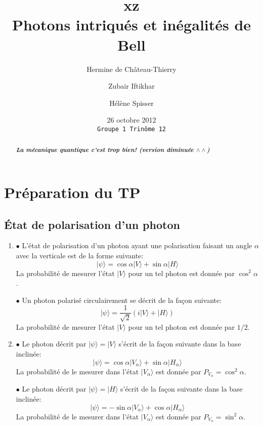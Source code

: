 \documentclass[twocolumn, 10pt]{article}
\title{ xz \\ Photons intriqués et inégalités de Bell}
\author{Hermine de Château-Thierry \and{Zubair Iftikhar} \and{Hélène Spisser}}
\date{26 octobre 2012 \\ \vspace{1em} \texttt{Groupe \no{}1 \hspace{2em} Trinôme \no{}12}}
\newcommand{\ket}[1]{\ensuremath{|#1\rangle}\xspace}
\begin{document}
\maketitle
\begin{abstract}
{{\itshape \bfseries
    La mécanique quantique c'est trop bien!
    (version diminuée $\wedge \wedge$)
}}
\end{abstract}



\section{Préparation du TP}

\subsection{\'Etat de polarisation d'un photon}

\begin{enumerate} 

    \item \par $\bullet$ L'état de polarisation d'un photon ayant une polarisation faisant un angle $\alpha$ avec la verticale est de la forme suivante:
        \[\ket{\psi} = \cos{\alpha} \ket{V} +  \sin{\alpha} \ket{H}\] 
La probabilité de mesurer l'état $\ket{V}$ pour un tel photon est donnée par $\cos^2{\alpha}$.

    \par $\bullet$ Un photon polarisé circulairement se décrit de la façon suivante:
\[\ket{\psi} =  \frac{1}{\sqrt{2}} ( i \ket{V} +  \ket{H} )\]
La probabilité de mesurer l'état $\ket{V}$ pour un tel photon est donnée par $1/2$.

    \item \par $\bullet$ Le photon décrit par $\ket{\psi} = \ket{V}$ s'écrit de la façon suivante dans la base inclinée: 
\[\ket{\psi} = \cos{\alpha} \ket{V_{\alpha}} +  \sin{\alpha} \ket{H_{\alpha}}\]
La probabilité de le mesurer dans l'état $\ket{V_{\alpha}}$ est donnée par $P_{V_{\alpha}} = \cos^2{\alpha}$.
    \par $\bullet$ Le photon décrit par $\ket{\psi} = \ket{H}$ s'écrit de la façon suivante dans la base inclinée: 
\[\ket{\psi} = -\sin{\alpha} \ket{V_{\alpha}} +  \cos{\alpha} \ket{H_{\alpha}}\]
La probabilité de le mesurer dans l'état $\ket{V_{\alpha}}$ est donnée par $P_{V_{\alpha}} = \sin^2{\alpha}$.

\end{enumerate}
\end{document}
